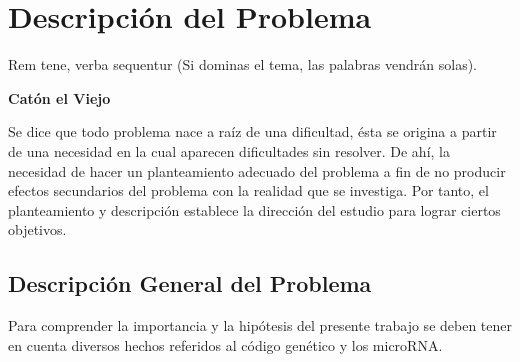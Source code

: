 \chapter{Descripción del Problema}

\epigraph{Rem tene, verba sequentur (Si dominas
el tema, las palabras vendrán solas).}%
{\textbf{Catón el Viejo}}

\par Se dice que todo problema nace a raíz de una dificultad, ésta se origina a partir de una necesidad en la cual aparecen dificultades sin resolver. De ahí, la necesidad de hacer un planteamiento adecuado del problema a fin de no producir efectos secundarios del problema con la realidad que se investiga. Por tanto, el planteamiento y descripción establece la dirección del estudio para lograr ciertos objetivos.

\section{Descripción General del Problema}

\par Para comprender la importancia y la hipótesis del presente trabajo se deben tener en cuenta diversos hechos referidos al código genético y los microRNA.

